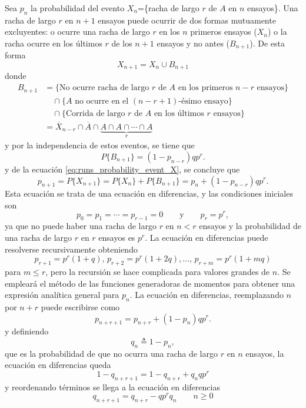 \documentclass[a4paper]{report}
\begin{document}
Sea \(p_n\) la probabilidad del evento \(X_n\)=\{racha de largo \(r\) de \(A\) en \(n\) ensayos\}. Una racha de largo \(r\) en \(n+1\) ensayos puede ocurrir de dos formas mutuamente excluyentes: o ocurre una racha de largo \(r\) en los \(n\) primeros ensayos (\(X_n\)) o la racha ocurre en los últimos \(r\) de los \(n+1\) ensayos y no antes (\(B_{n+1}\)). De esta forma
\begin{equation}\label{eq:runs_probability_event_X}
 X_{n+1}=X_n\cup B_{n+1}
\end{equation}
donde
\begin{align*}
 B_{n+1}&=\{\textrm{No ocurre racha de largo }r\textrm{ de } A \textrm{ en los primeros } n-r \textrm{ ensayos}\}\\
   &\quad\cap\{A\textrm{ no ocurre en el }(n-r+1)\textrm{-ésimo ensayo}\}\\
   &\quad\cap\{\textrm{Corrida de largo }r\textrm{ de } A \textrm{ en los últimos }r\textrm{ ensayos}\}\\
 &=\overline{X}_{n-r}\cap\overline{A}\cap\underbrace{A\cap A\cap\cdots\cap A}_{r}
\end{align*}
y por la independencia de estos eventos, se tiene que
\[
 P\{B_{n+1}\}=(1-p_{n-r})qp^r.
\]
y de la ecuación \ref{eq:runs_probability_event_X}, se concluye que
\[
 p_{n+1}=P\{X_{n+1}\}=P\{X_n\}+P\{B_{n+1}\}=p_{n}+(1-p_{n-r})qp^r.
\]
Esta ecuación se trata de una ecuación en diferencias, y las condiciones iniciales son
\[
 p_0=p_1=\cdots=p_{r-1}=0\qquad\textrm{y}\qquad p_r=p^r,
\]
ya que no puede haber una racha de largo \(r\) en \(n<r\) ensayos y la probabilidad de una racha de largo \(r\) en \(r\) ensayos es \(p^r\). La ecuación en diferencias puede resolverse recursivamente obteniendo
\[
 p_{r+1}=p^r(1+q),\,p_{r+2}=p^r(1+2q),\dots,\,p_{r+m}=p^r(1+mq)
\]
para \(m\leq r\), pero la recursión se hace complicada para valores grandes de \(n\). Se empleará el método de las funciones generadoras de momentos para obtener una expresión analítica general para \(p_n\). La ecuación en diferencias, reemplazando \(n\) por \(n+r\) puede escribirse como
\[
 p_{n+r+1}=p_{n+r}+(1-p_{n})qp^r.
\]
y definiendo
\[
 q_n\triangleq 1-p_n,
\]
que es la probabilidad de que no ocurra una racha de largo \(r\) en \(n\) ensayos, la ecuación en diferencias queda
\[
 1-q_{n+r+1}=1-q_{n+r}+q_{n}qp^r
\]
y reordenando términos se llega a la ecuación en diferencias
\begin{equation}\label{eq:runs_probability_difference_equation}
 q_{n+r+1}=q_{n+r}-qp^rq_{n}\qquad n\geq0
\end{equation}
\end{document}
